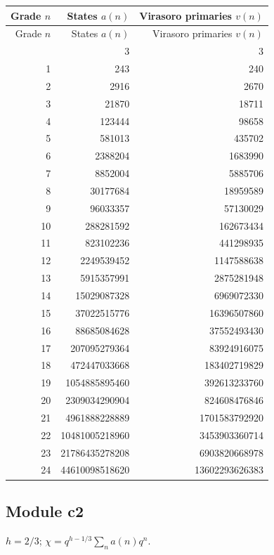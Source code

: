 \begingroup\small
\setlength{\tabcolsep}{5pt}
\begin{longtable}{@{}rrr@{}}
\toprule
Grade $n$ & States $a(n)$ & Virasoro primaries $v(n)$\\
\midrule\endfirsthead
\toprule
Grade $n$ & States $a(n)$ & Virasoro primaries $v(n)$\\
\midrule\endhead
\bottomrule\endfoot
0 & 3 & 3\\
1 & 243 & 240\\
2 & 2916 & 2670\\
3 & 21870 & 18711\\
4 & 123444 & 98658\\
5 & 581013 & 435702\\
6 & 2388204 & 1683990\\
7 & 8852004 & 5885706\\
8 & 30177684 & 18959589\\
9 & 96033357 & 57130029\\
10 & 288281592 & 162673434\\
11 & 823102236 & 441298935\\
12 & 2249539452 & 1147588638\\
13 & 5915357991 & 2875281948\\
14 & 15029087328 & 6969072330\\
15 & 37022515776 & 16396507860\\
16 & 88685084628 & 37552493430\\
17 & 207095279364 & 83924916075\\
18 & 472447033668 & 183402719829\\
19 & 1054885895460 & 392613233760\\
20 & 2309034290904 & 824608476846\\
21 & 4961888228889 & 1701583792920\\
22 & 10481005218960 & 3453903360714\\
23 & 21786435278208 & 6903820668978\\
24 & 44610098518620 & 13602293626383\\
\end{longtable}
\endgroup

\subsection{Module c2}
$h=2/3$; $\chi=q^{h-1/3}\sum_n a(n)q^n$.

